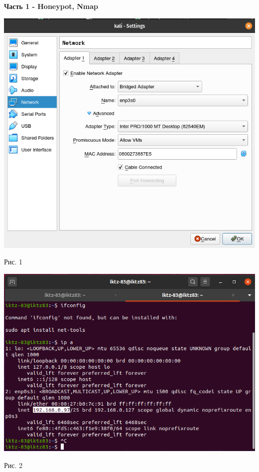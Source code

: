 \documentclass[a4paper,14pt]{extarticle}
\begin{document}
    \textbf{Часть 1 - Honeypot, Nmap}
    \begin{center}

        \includegraphics[scale=0.6]{pics/0.png}

        Рис. 1

        \includegraphics[scale=0.6]{pics/1.png}

        Рис. 2


\end{center}
\end{document}
